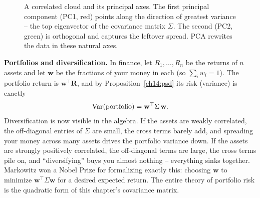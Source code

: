 \begin{figure}[H]
\centering
{}
\caption{A correlated cloud and its principal axes. The first principal component
(PC1, red) points along the direction of greatest variance -- the top eigenvector of
the covariance matrix $\Sigma$. The second (PC2, green) is orthogonal and captures
the leftover spread. PCA rewrites the data in these natural axes.}
\label{ch14:fig-pca}
\end{figure}

\begin{applicationbox}
\textbf{Portfolios and diversification.} In finance, let $R_1, \dots, R_n$ be the
returns of $n$ assets and let $\mathbf{w}$ be the fractions of your money in each
(so $\sum_i w_i = 1$). The portfolio return is $\mathbf{w}^\top \mathbf{R}$, and by
Proposition~\ref{ch14:psd} its risk (variance) is exactly
\[
\operatorname{Var}(\text{portfolio}) = \mathbf{w}^\top \Sigma\, \mathbf{w}.
\]
Diversification is now visible in the algebra. If the assets are weakly correlated,
the off-diagonal entries of $\Sigma$ are small, the cross terms barely add, and
spreading your money across many assets drives the portfolio variance down. If the
assets are strongly positively correlated, the off-diagonal terms are large, the
cross terms pile on, and ``diversifying'' buys you almost nothing -- everything sinks
together. Markowitz won a Nobel Prize for formalizing exactly this: choosing
$\mathbf{w}$ to minimize $\mathbf{w}^\top \Sigma \mathbf{w}$ for a desired expected
return. The entire theory of portfolio risk is the quadratic form of this chapter's
covariance matrix.
\end{applicationbox}

